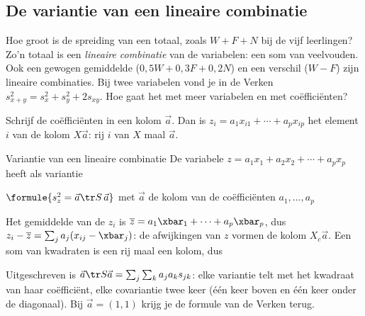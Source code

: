 \begin{oefeningen}
\end{oefeningen}

\subsection{De variantie van een lineaire combinatie}

Hoe groot is de spreiding van een totaal, zoals $W + F + N$ bij de vijf leerlingen? Zo'n totaal is een \textit{lineaire combinatie} van de variabelen: een som van veelvouden. Ook een gewogen gemiddelde ($0{,}5W + 0{,}3F + 0{,}2N$) en een verschil ($W - F$) zijn lineaire combinaties. Bij twee variabelen vond je in de Verken $s_{x+y}^2 = s_x^2 + s_y^2 + 2s_{xy}$. Hoe gaat het met meer variabelen en met coëfficiënten?

Schrijf de coëfficiënten in een kolom $\vec a$. Dan is $z_i = a_1x_{i1} + \cdots + a_px_{ip}$ het element $i$ van de kolom $X\vec a$: rij $i$ van $X$ maal $\vec a$.

\begin{theorie}
\begin{stelling}{Variantie van een lineaire combinatie}
De variabele $z = a_1x_1 + a_2x_2 + \cdots + a_px_p$ heeft als variantie

\qquad $\formule{s_z^2 = \vec a\tr S\,\vec a}$ \qquad met $\vec a$ de kolom van de coëfficiënten $a_1, \ldots, a_p$
\end{stelling}

\begin{bewijs}
Het gemiddelde van de $z_i$ is $\overline z = a_1\xbar_1 + \cdots + a_p\xbar_p$, dus $z_i - \overline z = \sum_j a_j(x_{ij} - \xbar_j)$: de afwijkingen van $z$ vormen de kolom $X_c\vec a$. Een som van kwadraten is een rij maal een kolom, dus
\end{bewijs}
\end{theorie}

Uitgeschreven is $\vec a\tr S\vec a = \sum_j \sum_k a_j a_k s_{jk}$: elke variantie telt met het kwadraat van haar coëfficiënt, elke covariantie twee keer (één keer boven en één keer onder de diagonaal). Bij $\vec a = (1, 1)$ krijg je de formule van de Verken terug.

